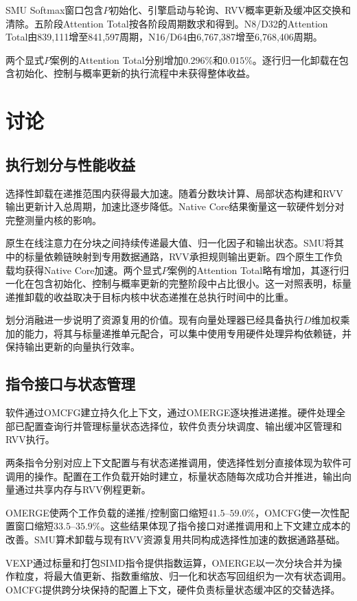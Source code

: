 \documentclass[journal]{IEEEtran}
\begin{document}
SMU Softmax窗口包含$P$初始化、引擎启动与轮询、RVV概率更新及缓冲区交换和清除。五阶段Attention Total按各阶段周期数求和得到。N8/D32的Attention Total由839,111增至841,597周期，N16/D64由6,767,387增至6,768,406周期。

两个显式$P$案例的Attention Total分别增加$0.296\%$和$0.015\%$。逐行归一化卸载在包含初始化、控制与概率更新的执行流程中未获得整体收益。

\section{讨论}
\subsection{执行划分与性能收益}
选择性卸载在递推范围内获得最大加速。随着分数块计算、局部状态构建和RVV输出更新计入总周期，加速比逐步降低。Native Core结果衡量这一软硬件划分对完整测量内核的影响。

原生在线注意力在分块之间持续传递最大值、归一化因子和输出状态。SMU将其中的标量依赖链映射到专用数据通路，RVV承担规则输出更新。四个原生工作负载均获得Native Core加速。两个显式$P$案例的Attention Total略有增加，其逐行归一化在包含初始化、控制与概率更新的完整阶段中占比很小。这一对照表明，标量递推卸载的收益取决于目标内核中状态递推在总执行时间中的比重。

划分消融进一步说明了资源复用的价值。现有向量处理器已经具备执行$D$维加权乘加的能力，将其与标量递推单元配合，可以集中使用专用硬件处理异构依赖链，并保持输出更新的向量执行效率。

\subsection{指令接口与状态管理}
软件通过OMCFG建立持久化上下文，通过OMERGE逐块推进递推。硬件处理全部已配置查询行并管理标量状态选择位，软件负责分块调度、输出缓冲区管理和RVV执行。

两条指令分别对应上下文配置与有状态递推调用，使选择性划分直接体现为软件可调用的操作。配置在工作负载开始时建立，标量状态随每次成功合并推进，输出向量通过共享内存与RVV例程更新。

OMERGE使两个工作负载的递推/控制窗口缩短$41.5$--$59.0\%$，OMCFG使一次性配置窗口缩短$33.5$--$35.9\%$。这些结果体现了指令接口对递推调用和上下文建立成本的改善。SMU算术卸载与现有RVV资源复用共同构成选择性加速的数据通路基础。

VEXP通过标量和打包SIMD指令提供指数运算，OMERGE以一次分块合并为操作粒度，将最大值更新、指数重缩放、归一化和状态写回组织为一次有状态调用。OMCFG提供跨分块保持的配置上下文，硬件负责标量状态缓冲区的交替选择。
\end{document}
